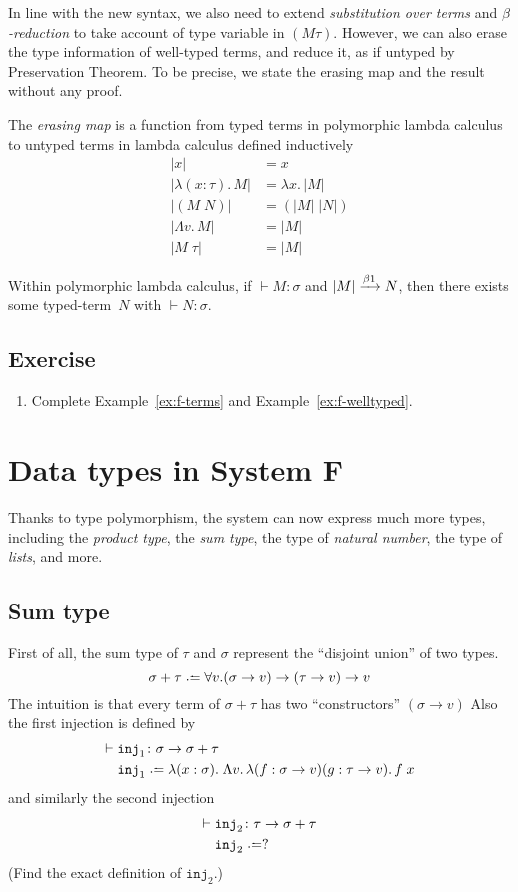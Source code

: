 In line with the new syntax, we also need to extend \emph{substitution over
  terms} and \emph{$\beta$-reduction} to take account of type variable in $(M
\tau)$. However, we can also erase the type information of well-typed terms, and
reduce it, as if untyped by Preservation Theorem. To be precise, we state the
erasing map and the result without any proof.
\begin{definition}
  The \emph{erasing map} is a function from typed terms in polymorphic lambda
  calculus to untyped terms in lambda calculus defined inductively 
  \begin{align*}
    |x| & = x \\
    |\lambda (x : \tau).\,M| & = \lambda x.\, |M| \\
    |(M\;N)| & = (|M|\;|N|) \\
    |\Lambda v.\, M| & = |M| \\
    |M\;\tau| & = |M|
  \end{align*}
\end{definition}
\begin{theorem}
  Within polymorphic lambda calculus, if ${}\vdash M : \sigma$ and $|M|
  \xrightarrow{\beta1} N$, then there exists some typed-term~$N$ with
  ${}\vdash N : \sigma$.
\end{theorem}
\subsection*{Exercise}
\begin{enumerate}
  \item Complete Example~\ref{ex:f-terms} and Example~\ref{ex:f-welltyped}.
\end{enumerate}
\section{Data types in System F}
Thanks to type polymorphism, the system can now express much more types,
including the \emph{product type}, the \emph{sum type}, the type of
\emph{natural number}, the type of \emph{lists}, and more.
\subsection{Sum type}
First of all, the sum type of $\tau$ and $\sigma$ represent the
``disjoint union'' of two types. 
\[
  \sigma + \tau \defeq \forall v. (\sigma \to v) \to (\tau \to v) \to v
\]
The intuition is that every term of $\sigma + \tau$ has two ``constructors''
$(\sigma \to v)$
Also the first injection is defined by
\begin{align*}
  \vdash {} & \mathtt{inj}_1 \colon \sigma \to \sigma + \tau \\
  & \mathtt{inj}_1 \defeq \lambda (x : \sigma).\;\Lambda v.\,\lambda (f :
  \sigma\to v)(g : \tau\to v).\, f\;x 
\end{align*}
and similarly the second injection
\begin{align*}
  \vdash {} & \mathtt{inj}_2 \colon \tau \to \sigma + \tau \\
  & \mathtt{inj}_2 \defeq ?
\end{align*}
(Find the exact definition of $\mathtt{inj}_2$.)

